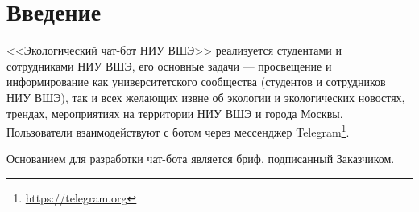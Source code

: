 \section{Введение}
\label{sec:intro}
<<Экологический чат-бот НИУ ВШЭ>> реализуется студентами и сотрудниками НИУ ВШЭ, его основные
задачи --- просвещение и информирование как университетского сообщества (студентов и сотрудников
НИУ ВШЭ), так и всех желающих извне об экологии и экологических новостях, трендах, мероприятиях на
территории НИУ ВШЭ и города Москвы. Пользователи взаимодействуют с ботом через мессенджер
Telegram\footnote{\url{https://telegram.org}}.

Основанием для разработки чат-бота является бриф, подписанный Заказчиком.
